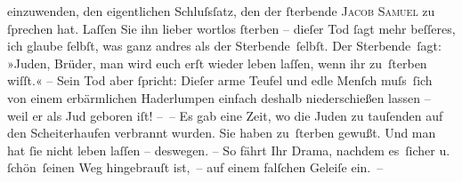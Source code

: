                einzuwenden, den eigentlichen Schluſsſatz, den der{ }ſterbende \textsc{Jacob Samuel} zu{ }ſprechen hat. Laſſen Sie ihn lieber wortlos{ }ſterben – dieſer Tod{ }ſagt mehr
               beſſeres, ich glaube{ }ſelbſt, was ganz andres als der Sterbende ſelbſt. Der
               Sterbende ſagt: »Juden, Brüder, man
                  wird euch erſt wieder leben laſſen, wenn ihr zu ſterben wiſſt.« – Sein Tod
               aber{ }ſpricht: Dieſer arme Teufel und edle Menſch muſs ſich von einem erbärmlichen {\pb}Haderlumpen einfach deshalb niederschießen lassen – weil er
               als Jud geboren iſt! – – Es gab eine Zeit, wo die Juden zu tauſenden auf den
               Scheiterhaufen verbrannt wurden. Sie haben zu ſterben gewußt. Und man hat{ }ſie nicht
               leben laſſen – deswegen. – So fährt Ihr Drama, nachdem es ſicher u.{ }ſchön ſeinen Weg hingebrauſt
               ist, – auf einem falſchen Geleiſe ein. –\pend
           
